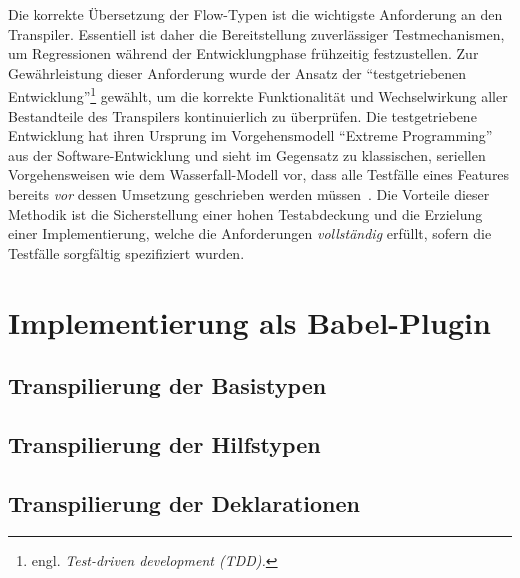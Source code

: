 Die korrekte Übersetzung der Flow-Typen ist die wichtigste Anforderung an den Transpiler. Essentiell ist daher die Bereitstellung zuverlässiger Testmechanismen, um Regressionen während der Entwicklungphase frühzeitig festzustellen. Zur Gewährleistung dieser Anforderung wurde der Ansatz der \enquote{testgetriebenen Entwicklung}\footnote{engl. \textit{Test-driven development (TDD).}} gewählt, um die korrekte Funktionalität und Wechselwirkung aller Bestandteile des Transpilers kontinuierlich zu überprüfen. Die testgetriebene Entwicklung hat ihren Ursprung im Vorgehensmodell \enquote{Extreme Programming}~\autocite{JEFFRIES:EXTREME_PROGRAMMING} aus der Software-Entwicklung und sieht im Gegensatz zu klassischen, seriellen Vorgehensweisen wie dem Wasserfall-Modell vor, dass alle Testfälle eines Features bereits \emph{vor} dessen Umsetzung geschrieben werden müssen~\autocite{KENT:EXTREME_PROGRAMMING}. Die Vorteile dieser Methodik ist die Sicherstellung einer hohen Testabdeckung und die Erzielung einer Implementierung, welche die Anforderungen \emph{vollständig} erfüllt, sofern die Testfälle sorgfältig spezifiziert wurden.







\section{Implementierung als Babel-Plugin}
  \subsection{Transpilierung der Basistypen}
  \subsection{Transpilierung der Hilfstypen}
  \subsection{Transpilierung der Deklarationen}

